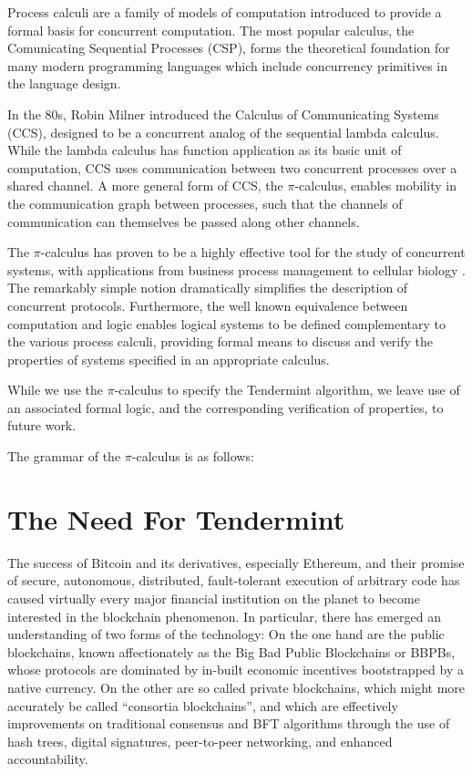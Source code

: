 Process calculi are a family of models of computation introduced 
to provide a formal basis for concurrent computation.
The most popular calculus, the Comunicating Sequential Processes (CSP),
forms the theoretical foundation for many modern programming languages which 
include concurrency primitives in the language design.

In the 80s, Robin Milner introduced the Calculus of Communicating Systems (CCS), 
designed to be a concurrent analog of the sequential lambda calculus.
While the lambda calculus has function application as its basic unit of computation,
CCS uses communication between two concurrent processes over a shared channel.
A more general form of CCS, the $\pi$-calculus, 
enables mobility in the communication graph between processes, 
such that the channels of communication can themselves be passed along other channels.

The $\pi$-calculus has proven to be a highly effective tool for the study of concurrent systems,
with applications from business process management \cite{pi_biz} to cellular biology \cite{stochastic_pi}.
The remarkably simple notion dramatically simplifies the description of concurrent protocols.
Furthermore, the well known equivalence between computation and logic \cite{curry_howard} enables
logical systems to be defined complementary to the various process calculi,
providing formal means to discuss and verify the properties of systems specified in an appropriate calculus.

While we use the $\pi$-calculus to specify the Tendermint algorithm, 
we leave use of an associated formal logic, and the corresponding verification of properties, to future work.

The grammar of the $\pi$-calculus is as follows:















\section{The Need For Tendermint}

The success of Bitcoin and its derivatives, especially Ethereum, and their promise of secure, autonomous, distributed, fault-tolerant execution of arbitrary code has caused virtually every major financial institution on the planet to become interested in the blockchain phenomenon. 
In particular, there has emerged an understanding of two forms of the technology:
On the one hand are the public blockchains, known affectionately as the Big Bad Public Blockchains or BBPBs, 
whose protocols are dominated by in-built economic incentives bootstrapped by a native currency.
On the other are so called private blockchains, which might more accurately be called ``consortia blockchains'',
and which are effectively improvements on traditional consensus and BFT algorithms through the use of hash trees, digital signatures, 
peer-to-peer networking, and enhanced accountability.

